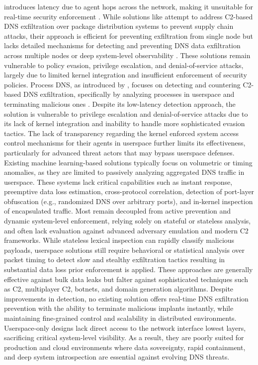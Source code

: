 \documentclass [11pt, proquest] {uwthesis}[2020/02/24]
\begin{document}
introduces latency due to agent hops across the network, making it unsuitable for real-time security enforcement \cite{9486400}. While solutions like \citeauthor{haider2024c2}  attempt to address C2-based DNS exfiltration over package distribution systems to prevent supply chain attacks, their approach is efficient for preventing exfiltration from single node but lacks detailed mechanisms for detecting and preventing DNS data exfiltration across multiple nodes or deep system-level observability \cite{haider2024c2,sivakorn2019countering}. These solutions remain vulnerable to policy evasion, privilege escalation, and denial-of-service attacks, largely due to limited kernel integration and insufficient enforcement of security policies. Process DNS, as introduced by \citeauthor{sivakorn2019countering}, focuses on detecting and countering C2-based DNS exfiltration, specifically by analyzing processes in userspace and terminating malicious ones \cite{sivakorn2019countering}. Despite its low-latency detection approach, the solution is vulnerable to privilege escalation and denial-of-service attacks due to its lack of kernel integration and inability to handle more sophisticated evasion tactics. The lack of transparency regarding the kernel enforced system access control mechanisms for their agents in userspace further limits its effectiveness, particularly for advanced threat actors that may bypass userspace defenses.
Existing machine learning-based solutions typically focus on volumetric or timing anomalies, as they are limited to passively analyzing aggregated DNS traffic in userspace. These systems lack critical capabilities such as instant response, preemptive data loss estimation, cross-protocol correlation, detection of port-layer obfuscation (e.g., randomized DNS over arbitrary ports), and in-kernel inspection of encapsulated traffic. Most remain decoupled from active prevention and dynamic system-level enforcement, relying solely on stateful or stateless analysis, and often lack evaluation against advanced adversary emulation and modern C2 frameworks. While stateless lexical inspection can rapidly classify malicious payloads, userspace solutions still require behavioral or statistical analysis over packet timing to detect slow and stealthy exfiltration tactics resulting in substantial data loss prior enforcement is applied. These approaches are generally effective against bulk data leaks but falter against sophisticated techniques such as C2, multiplayer C2, botnets, and domain generation algorithms. Despite improvements in detection, no existing solution offers real-time DNS exfiltration prevention with the ability to terminate malicious implants instantly, while maintaining fine-grained control and scalability in distributed environments. Userspace-only designs lack direct access to the network interface lowest layers, sacrificing critical system-level visibility. As a result, they are poorly suited for production and cloud environments where data sovereignty, rapid containment, and deep system introspection are essential against evolving DNS threats.
\end{document}
